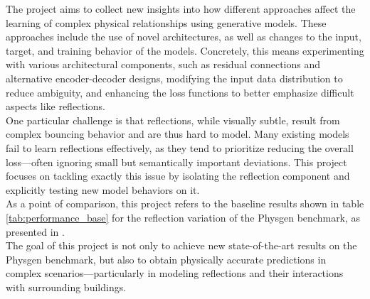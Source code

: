 		The project aims to collect new insights into how different approaches affect the learning of complex physical relationships using generative models. These approaches include the use of novel architectures, as well as changes to the input, target, and training behavior of the models. Concretely, this means experimenting with various architectural components, such as residual connections and alternative encoder-decoder designs, modifying the input data distribution to reduce ambiguity, and enhancing the loss functions to better emphasize difficult aspects like reflections.\\
		One particular challenge is that reflections, while visually subtle, result from complex bouncing behavior and are thus hard to model. Many existing models fail to learn reflections effectively, as they tend to prioritize reducing the overall loss—often ignoring small but semantically important deviations. This project focuses on tackling exactly this issue by isolating the reflection component and explicitly testing new model behaviors on it.\\
		As a point of comparison, this project refers to the baseline results shown in table \ref{tab:performance_base} for the reflection variation of the Physgen benchmark, as presented in \cite{martin_spitznagel_physicsgen_2025}\cite{achim_eckerle_evaluierung_2025}.\\
		The goal of this project is not only to achieve new state-of-the-art results on the Physgen benchmark, but also to obtain physically accurate predictions in complex scenarios—particularly in modeling reflections and their interactions with surrounding buildings.
		
		
		
